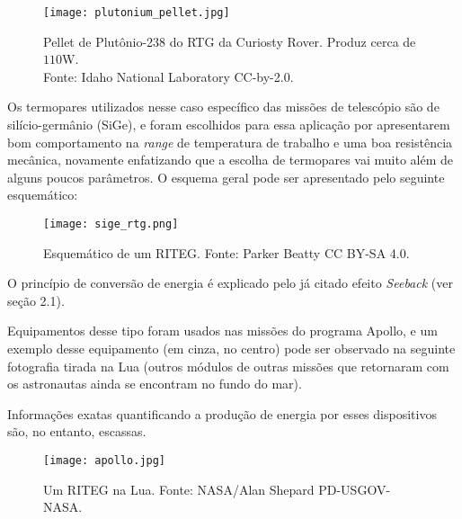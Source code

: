\documentclass[a4paper,12pt]{report}
\begin{document}
	\begin{figure}[H]
		\centering
		\texttt{[image: plutonium\_pellet.jpg]}\\
		\caption{Pellet de Plutônio-238 do RTG da Curiosty Rover. Produz cerca de $110$W.\\ Fonte: Idaho National Laboratory CC-by-2.0.}
	\end{figure}

	Os termopares utilizados nesse caso específico das missões de telescópio são de silício-germânio (SiGe), e foram escolhidos para essa aplicação por apresentarem bom comportamento na \textit{range} de temperatura de trabalho e uma boa resistência mecânica, novamente enfatizando que a escolha de termopares vai muito além de alguns poucos parâmetros.
\newpage
	O esquema geral pode ser apresentado pelo seguinte esquemático:
	
	\begin{figure}[H]
		\centering
		\texttt{[image: sige\_rtg.png]}\\
		\caption{Esquemático de um RITEG. Fonte: Parker Beatty CC BY-SA 4.0.}
	\end{figure}

	O princípio de conversão de energia é explicado pelo já citado efeito \textit{Seeback} (ver seção 2.1). 
	
	Equipamentos desse tipo foram usados nas missões do programa Apollo, e um exemplo desse equipamento (em cinza, no centro) pode ser observado na seguinte fotografia tirada na Lua (outros módulos de outras missões que retornaram com os astronautas ainda se encontram no fundo do mar).
	
	Informações exatas quantificando a produção de energia por esses dispositivos são, no entanto, escassas.
	
		\begin{figure}[H]
		\centering
		\texttt{[image: apollo.jpg]}\\
		\caption{Um RITEG na Lua. Fonte: NASA/Alan Shepard PD-USGOV-NASA.}
	\end{figure}

	
	
\end{document}

